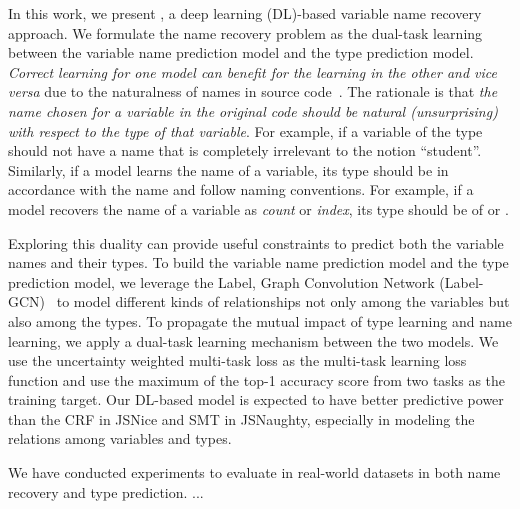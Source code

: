 


In this work, we present {\tool}, a deep learning (DL)-based variable
name recovery approach. We formulate the name recovery problem as the
dual-task learning between the variable name prediction model and the
type prediction model. {\em Correct learning for one model can benefit
  for the learning in the other and vice versa} due to the naturalness
of names in source code~\cite{hindle-icse12}. The rationale is that
{\em the name chosen for a variable in the original code should be
  natural (unsurprising) with respect to the type of that
  variable}. For example, if a variable of the type 
should not have a name that is completely irrelevant to the notion
``student''. Similarly, if a model learns the name of a variable, its
type should be in accordance with the name and follow naming
conventions. For example, if a model recovers the name of a variable
as {\em count} or {\em index}, its type should be of  or
.

Exploring this duality can provide useful constraints to predict both
the variable names and their types.  To build the variable name
prediction model and the type prediction model, we leverage the Label,
Graph Convolution Network (Label-GCN)~\cite{label-gcn} to model
different kinds of relationships not only among the variables but also
among the types. To propagate the mutual impact of type learning and
name learning, we apply a dual-task learning mechanism between the two
models. We use the uncertainty weighted multi-task loss as the
multi-task learning loss function and use the maximum of the top-1
accuracy score from two tasks as the training target. Our DL-based
model is expected to have better predictive power than the CRF in
JSNice and SMT in JSNaughty, especially in modeling the relations
among variables and types.

We have conducted experiments to evaluate {\tool} in real-world
datasets in both name recovery and type prediction. ...
